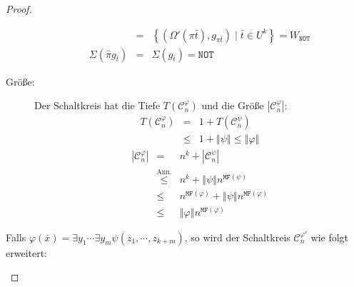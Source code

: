 \begin{proof}
\begin{casenv}
\begin{description}
\begin{eqnarray*}
 & = & \left\{ \left(\Omega'\left(\pi\bar{t}\right),g_{\pi\bar{t}}\right)\mid\bar{t}\in U^{k}\right\} =W_{\mathtt{NOT}}\\
\Sigma\left(\hat{\pi}g_{\bar{t}}\right) & = & \Sigma\left(g_{\bar{t}}\right)=\mathtt{NOT}
\end{eqnarray*}
\item [{Größe:}] Der Schaltkreis hat die Tiefe $T\left(\mathcal{C}_{n}^{\varphi}\right)$
und die Größe $\left|\mathcal{C}_{n}^{\varphi}\right|$: 
\begin{eqnarray*}
T\left(\mathcal{C}_{n}^{\varphi}\right) & = & 1+T\left(\mathcal{C}_{n}^{\psi}\right)\\
 & \leqslant & 1+\left\Vert \psi\right\Vert \leqslant\left\Vert \varphi\right\Vert 
\end{eqnarray*}
\begin{eqnarray*}
\left|\mathcal{C}_{n}^{\varphi}\right| & = & n^{k}+\left|\mathcal{C}_{n}^{\psi}\right|\\
 & \overset{\mathrm{Ann.}}{\leqslant} & n^{k}+\left\Vert \psi\right\Vert n^{\mathtt{MF}\left(\psi\right)}\\
 & \leqslant & n^{\mathtt{MF}\left(\varphi\right)}+\left\Vert \psi\right\Vert n^{\mathtt{MF}\left(\varphi\right)}\\
 & \leqslant & \left\Vert \varphi\right\Vert n^{\mathtt{MF}\left(\varphi\right)}
\end{eqnarray*}
\end{description}
\item \label{case:fo-ex}Falls $\varphi\left(\bar{x}\right)=\exists y_{1}\cdots\exists y_{m}\psi\left(z_{1},\cdots,z_{k+m}\right)$,
so wird der Schaltkreis $\mathcal{C}_{n}^{\varphi'}$ wie folgt erweitert:


\end{casenv}
\end{proof}

